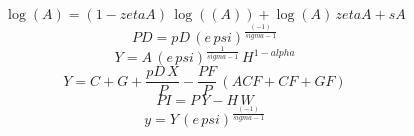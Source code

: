 \begin{dmath}
\log\left({A}\right)=\left(1-{zetaA}\right)\, \log\left(({A})\right)+\log\left({A}\right)\, {zetaA}+{sA}
\end{dmath}
\begin{dmath}
{PD}={pD}\, \left({e}\, {psi}\right)^{\frac{\left(-1\right)}{{sigma}-1}}
\end{dmath}
\begin{dmath}
{Y}={A}\, \left({e}\, {psi}\right)^{\frac{1}{{sigma}-1}}\, {H}^{1-{alpha}}
\end{dmath}
\begin{dmath}
{Y}={C}+{G}+\frac{{pD}\, {X}}{{P}}-\frac{{PF}}{{P}}\, \left({ACF}+{CF}+{GF}\right)
\end{dmath}
\begin{dmath}
{PI}={P}\, {Y}-{H}\, {W}
\end{dmath}
\begin{dmath}
{y}={Y}\, \left({e}\, {psi}\right)^{\frac{\left(-1\right)}{{sigma}-1}}
\end{dmath}
